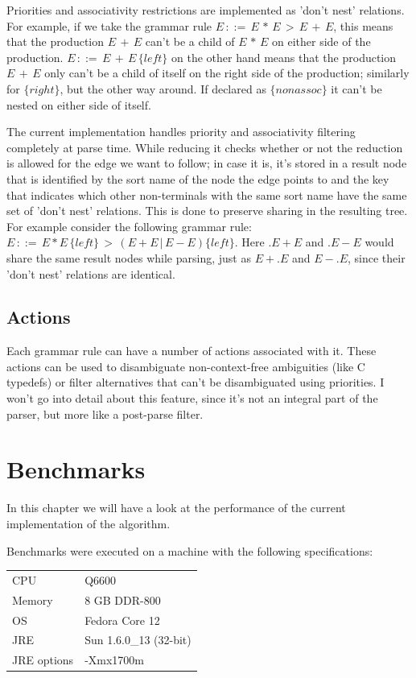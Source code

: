 \documentclass[a4paper,10pt]{article}
\begin{document}
Priorities and associativity restrictions are implemented as 'don't nest' relations. For example, if we take the grammar rule $E\,::=\,E\,*\,E\,>\,E\,+\,E$, this means that the production $E\,+\,E$ can't be a child of $E\,*\,E$ on either side of the production. $E\,::=\,E\,+\,E\,\{left\}$ on the other hand means that the production $E\,+\,E$ only can't be a child of itself on the right side of the production; similarly for $\{right\}$, but the other way around. If declared as $\{nonassoc\}$ it can't be nested on either side of itself.

The current implementation handles priority and associativity filtering completely at parse time. While reducing it checks whether or not the reduction is allowed for the edge we want to follow; in case it is, it's stored in a result node that is identified by the sort name of the node the edge points to and the key that indicates which other non-terminals with the same sort name have the same set of 'don't nest' relations. This is done to preserve sharing in the resulting tree. For example consider the following grammar rule: $E\,::=\,E * E\,\{left\}\,>\,(E + E\,|\,E - E)\{left\}$. Here $.E + E$ and $.E - E$ would share the same result nodes while parsing, just as $E+.E$ and $E-.E$, since their 'don't nest' relations are identical.

\subsection{Actions}

Each grammar rule can have a number of actions associated with it. These actions can be used to disambiguate non-context-free ambiguities (like C typedefs) or filter alternatives that can't be disambiguated using priorities. I won't go into detail about this feature, since it's not an integral part of the parser, but more like a post-parse filter.

\section{Benchmarks}

In this chapter we will have a look at the performance of the current implementation of the algorithm.

Benchmarks were executed on a machine with the following specifications:
\begin{table}[H]
\centering
\begin{tabular}{ | p{6em} | p{9em} | }
 \hline
 CPU & Q6600 \\
 Memory & 8 GB DDR-800 \\
 OS & Fedora Core 12 \\
 JRE & Sun 1.6.0\_13 (32-bit) \\
 JRE options & -Xmx1700m \\
 \hline
\end{tabular}
\end{table}
\end{document}
